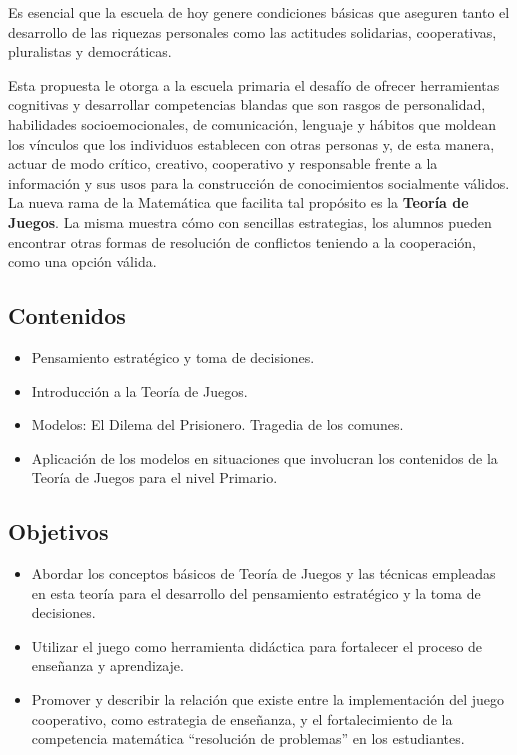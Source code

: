 Es esencial que la escuela de hoy genere condiciones básicas que aseguren tanto el desarrollo de las riquezas personales como las actitudes solidarias, cooperativas, pluralistas y democráticas.

Esta propuesta le otorga a la escuela primaria el desafío de ofrecer herramientas cognitivas y desarrollar competencias blandas que son rasgos de personalidad, habilidades socioemocionales, de comunicación, lenguaje y hábitos que moldean los vínculos que los individuos establecen con otras personas y, de esta manera, actuar de modo crítico, creativo, cooperativo y responsable frente a la información y sus usos para la construcción de conocimientos socialmente válidos. La nueva rama de la Matemática que facilita tal propósito es la \textbf{Teoría de Juegos}. La misma muestra cómo con sencillas estrategias, los alumnos pueden encontrar otras formas de resolución de conflictos teniendo a la cooperación, como una opción válida.

\subsection{Contenidos}

\begin{itemize}
	\item Pensamiento estratégico y toma de decisiones.
	\item Introducción a la Teoría de Juegos.
	\item Modelos: El Dilema del Prisionero. Tragedia de los comunes.
	\item Aplicación de los modelos en situaciones que involucran los contenidos de la Teoría de Juegos para el nivel Primario.
\end{itemize}

\subsection{Objetivos}

\begin{itemize}
	\item Abordar los conceptos básicos de Teoría de Juegos y las técnicas empleadas en esta teoría para el desarrollo del pensamiento estratégico y la toma de decisiones.
	\item Utilizar el juego como herramienta didáctica para fortalecer el proceso de enseñanza y aprendizaje.
	\item Promover y describir la relación que existe entre la implementación del juego cooperativo, como estrategia de enseñanza, y el fortalecimiento de la competencia matemática “resolución de problemas” en los estudiantes.
\end{itemize}

